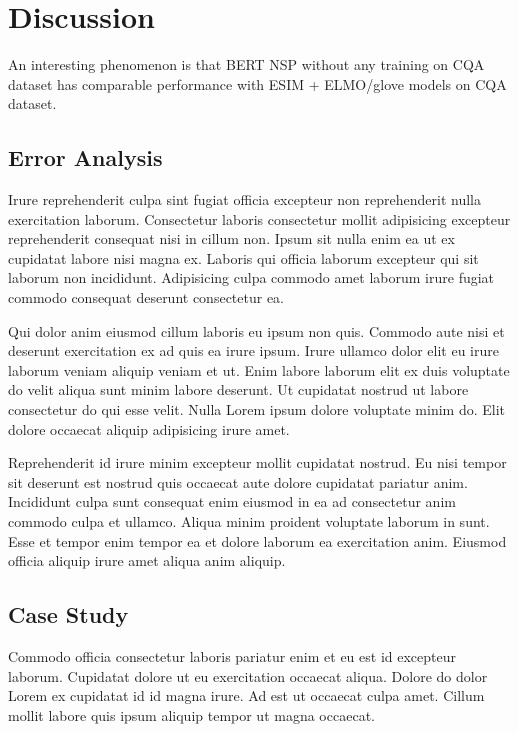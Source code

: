 \documentclass[letterpaper]{article} %
\begin{document}
{\section{Discussion}

An interesting phenomenon is that BERT NSP without any training on CQA dataset has comparable performance with ESIM + ELMO/glove models on CQA dataset.

\subsection{Error Analysis}

Irure reprehenderit culpa sint fugiat officia excepteur non reprehenderit nulla exercitation laborum. Consectetur laboris consectetur mollit adipisicing excepteur reprehenderit consequat nisi in cillum non. Ipsum sit nulla enim ea ut ex cupidatat labore nisi magna ex. Laboris qui officia laborum excepteur qui sit laborum non incididunt. Adipisicing culpa commodo amet laborum irure fugiat commodo consequat deserunt consectetur ea.

Qui dolor anim eiusmod cillum laboris eu ipsum non quis. Commodo aute nisi et deserunt exercitation ex ad quis ea irure ipsum. Irure ullamco dolor elit eu irure laborum veniam aliquip veniam et ut. Enim labore laborum elit ex duis voluptate do velit aliqua sunt minim labore deserunt. Ut cupidatat nostrud ut labore consectetur do qui esse velit. Nulla Lorem ipsum dolore voluptate minim do. Elit dolore occaecat aliquip adipisicing irure amet.

Reprehenderit id irure minim excepteur mollit cupidatat nostrud. Eu nisi tempor sit deserunt est nostrud quis occaecat aute dolore cupidatat pariatur anim. Incididunt culpa sunt consequat enim eiusmod in ea ad consectetur anim commodo culpa et ullamco. Aliqua minim proident voluptate laborum in sunt. Esse et tempor enim tempor ea et dolore laborum ea exercitation anim. Eiusmod officia aliquip irure amet aliqua anim aliquip.

\subsection{Case Study}

Commodo officia consectetur laboris pariatur enim et eu est id excepteur laborum. Cupidatat dolore ut eu exercitation occaecat aliqua. Dolore do dolor Lorem ex cupidatat id id magna irure. Ad est ut occaecat culpa amet. Cillum mollit labore quis ipsum aliquip tempor ut magna occaecat.

}
\end{document}
